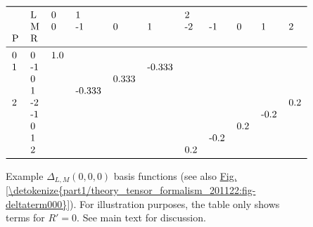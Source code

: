 \documentclass[letterpaper,table,10pt,english]{jupyterBook}
\begin{document}
\begin{figure}[htbp]
\centering
\capstart
\begin{equation*}
\begin{split}\begin{tabular}{lllllllllll}
\toprule
  & L &    0 & \multicolumn{3}{l}{1} & \multicolumn{5}{l}{2} \\
  & M &    0 &     -1 &      0 &      1 &   -2 &   -1 &    0 &    1 &    2 \\
P & R &      &        &        &        &      &      &      &      &      \\
\midrule
0 &  0 &  1.0 &        &        &        &      &      &      &      &      \\
1 & -1 &      &        &        & -0.333 &      &      &      &      &      \\
  &  0 &      &        &  0.333 &        &      &      &      &      &      \\
  &  1 &      & -0.333 &        &        &      &      &      &      &      \\
2 & -2 &      &        &        &        &      &      &      &      &  0.2 \\
  & -1 &      &        &        &        &      &      &      & -0.2 &      \\
  &  0 &      &        &        &        &      &      &  0.2 &      &      \\
  &  1 &      &        &        &        &      & -0.2 &      &      &      \\
  &  2 &      &        &        &        &  0.2 &      &      &      &      \\
\bottomrule
\end{tabular}\end{split}
\end{equation*}\caption{Example \(\Delta_{L,M}(0,0,0)\) basis functions (see also \hyperref[\detokenize{part1/theory_tensor_formalism_201122:fig-deltaterm000}]{Fig.\@ \ref{\detokenize{part1/theory_tensor_formalism_201122:fig-deltaterm000}}}). For illustration purposes, the table only shows terms for \(R'=0\). See main text for discussion.}\label{\detokenize{part1/theory_tensor_formalism_201122:tab-deltaterm000}}\end{figure}
\end{document}
